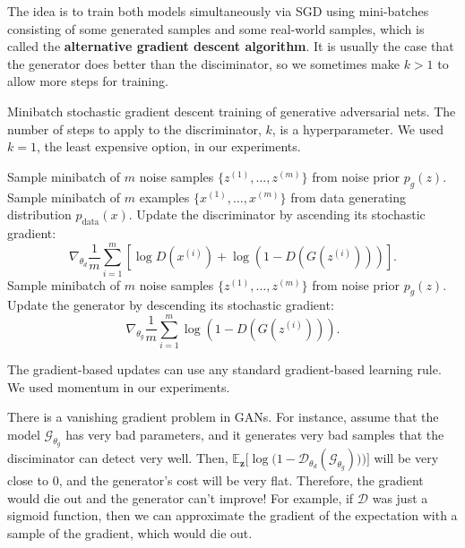   \begin{algo}
    The idea is to train both models simultaneously via SGD using mini-batches consisting of some generated samples and some real-world samples, which is called the \textbf{alternative gradient descent algorithm}. It is usually the case that the generator does better than the disciminator, so we sometimes make $k > 1$ to allow more steps for training. 
    \begin{algorithm}[H]
      \caption{Minibatch stochastic gradient descent training of generative adversarial nets. The number of steps to apply to the discriminator, $k$, is a hyperparameter. We used $k = 1$, the least expensive option, in our experiments.}
      \label{alg:alt_gd}
      \begin{algorithmic}[1] 
                \State Sample minibatch of $m$ noise samples $\{z^{(1)}, \ldots, z^{(m)}\}$ from noise prior $p_g(z)$.
                \State Sample minibatch of $m$ examples $\{x^{(1)}, \ldots, x^{(m)}\}$ from data generating distribution $p_{\text{data}}(x)$.
                \State Update the discriminator by ascending its stochastic gradient:
                \[
                    \nabla_{\theta_d} \frac{1}{m} \sum_{i=1}^m \left[\log D\left(x^{(i)}\right) + \log\left(1-D\left(G\left(z^{(i)}\right)\right)\right)\right].
                \]
            \EndFor
            \State Sample minibatch of $m$ noise samples $\{z^{(1)}, \ldots, z^{(m)}\}$ from noise prior $p_g(z)$.
            \State Update the generator by descending its stochastic gradient:
            \[
                \nabla_{\theta_g} \frac{1}{m} \sum_{i=1}^m \log\left(1-D\left(G\left(z^{(i)}\right)\right)\right).
            \]
        \EndFor
      \end{algorithmic}
    \end{algorithm}
    The gradient-based updates can use any standard gradient-based learning rule. We used momentum in our experiments.
  \end{algo} 

  There is a vanishing gradient problem in GANs. For instance, assume that the model $\mathcal{G}_{\theta_g}$ has very bad parameters, and it generates very bad samples that the disciminator can detect very well. Then, $\mathbb{E}_{\mathbf{z}} \big[ \log \big( 1 - \mathcal{D}_{\theta_d} (\mathcal{G}_{\theta_g}))\big) \big]$ will be very close to $0$, and the generator's cost will be very flat. Therefore, the gradient would die out and the generator can't improve! For example, if $\mathcal{D}$ was just a sigmoid function, then we can approximate the gradient of the expectation with a sample of the gradient, which would die out. 

